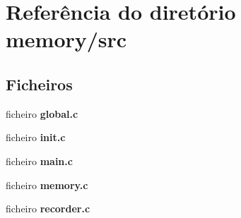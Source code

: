 \section{Referência do diretório memory/src}
\label{dir_8901ff8f45a3b1ed413716ee91f90a15}
\subsection*{Ficheiros}
\begin{DoxyCompactItemize}
\item 
ficheiro \textbf{ global.\+c}
\item 
ficheiro \textbf{ init.\+c}
\item 
ficheiro \textbf{ main.\+c}
\item 
ficheiro \textbf{ memory.\+c}
\item 
ficheiro \textbf{ recorder.\+c}
\end{DoxyCompactItemize}
